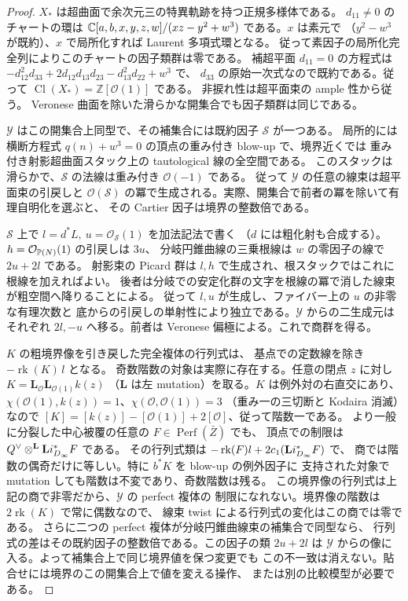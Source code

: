 \begin{proof}
$X_*$ は超曲面で余次元三の特異軌跡を持つ正規多様体である。
$d_{11}\ne0$ のチャートの環は
$\mathbb C[a,b,x,y,z,w]/(xz-y^2+w^3)$ である。$x$ は素元で
（$y^2-w^3$ が既約）、$x$ で局所化すれば Laurent 多項式環となる。
従って素因子の局所化完全列によりこのチャートの因子類群は零である。
補超平面 $d_{11}=0$ の方程式は
$-d_{12}^2 d_{33}+2d_{12}d_{13}d_{23}-d_{13}^2d_{22}+w^3$ で、
$d_{33}$ の原始一次式なので既約である。従って
$\operatorname{Cl}(X_*)=\mathbb Z[\mathcal O(1)]$ である。
非捩れ性は超平面束の ample 性から従う。
Veronese 曲面を除いた滑らかな開集合でも因子類群は同じである。

$\mathcal Y$ はこの開集合上同型で、その補集合には既約因子 $\mathcal S$ が一つある。
局所的には横断方程式 $q(n)+w^3=0$ の頂点の重み付き blow-up で、境界近くでは
重み付き射影超曲面スタック上の tautological 線の全空間である。
このスタックは滑らかで、$\mathcal S$ の法線は重み付き $\mathcal O(-1)$ である。
従って $\mathcal Y$ の任意の線束は超平面束の引戻しと $\mathcal O(\mathcal S)$
の冪で生成される。実際、開集合で前者の冪を除いて有理自明化を選ぶと、
その Cartier 因子は境界の整数倍である。

$\mathcal S$ 上で $l=d^*L,\ u=\mathcal O_{\mathcal S}(1)$ を加法記法で書く
（$d$ には粗化射も合成する）。$h=\mathcal O_{\mathbb P(N)}(1)$ の引戻しは $3u$、
分岐円錐曲線の三乗根線は $w$ の零因子の線で $2u+2l$ である。
射影束の Picard 群は $l,h$ で生成され、根スタックではこれに根線を加えればよい。
後者は分岐での安定化群の文字を根線の冪で消した線束が粗空間へ降りることによる。
従って $l,u$ が生成し、ファイバー上の $u$ の非零な有理次数と
底からの引戻しの単射性により独立である。$\mathcal Y$ からの二生成元は
それぞれ $2l,-u$ へ移る。前者は Veronese 偏極による。これで商群を得る。

$K$ の粗境界像を引き戻した完全複体の行列式は、
基点での定数線を除き $-\operatorname{rk}(K)\,l$ となる。
奇数階数の対象は実際に存在する。任意の閉点 $z$ に対し
$K=\mathbf L_{\mathcal O}\mathbf L_{\mathcal O(1)}k(z)$
（$\mathbf L$ は左 mutation）を取る。$K$ は例外対の右直交にあり、
$\chi(\mathcal O(1),k(z))=1$、$\chi(\mathcal O,\mathcal O(1))=3$
（重み一の三切断と Kodaira 消滅）なので
$[K]=[k(z)]-[\mathcal O(1)]+2[\mathcal O]$、従って階数一である。
より一般に分裂した中心被覆の任意の $F\in\operatorname{Perf}(\bar Z)$ でも、
頂点での制限は $Q^\vee\otimes^{\mathbf L}{\bf L}i_{D_\infty}^*F$ である。
その行列式類は $-\operatorname{rk}(F)l+2c_1({\bf L}i_{D_\infty}^*F)$ で、
商では階数の偶奇だけに等しい。特に $b^*K$ を blow-up の例外因子に
支持された対象で mutation しても階数は不変であり、奇数階数は残る。
この境界像の行列式は上記の商で非零だから、$\mathcal Y$ の perfect 複体の
制限になれない。境界像の階数は $2\operatorname{rk}(K)$ で常に偶数なので、
線束 twist による行列式の変化はこの商では零である。
さらに二つの perfect 複体が分岐円錐曲線束の補集合で同型なら、
行列式の差はその既約因子の整数倍である。この因子の類 $2u+2l$ は
$\mathcal Y$ からの像に入る。よって補集合上で同じ境界値を保つ変更でも
この不一致は消えない。貼合せには境界のこの開集合上で値を変える操作、
または別の比較模型が必要である。
\end{proof}

